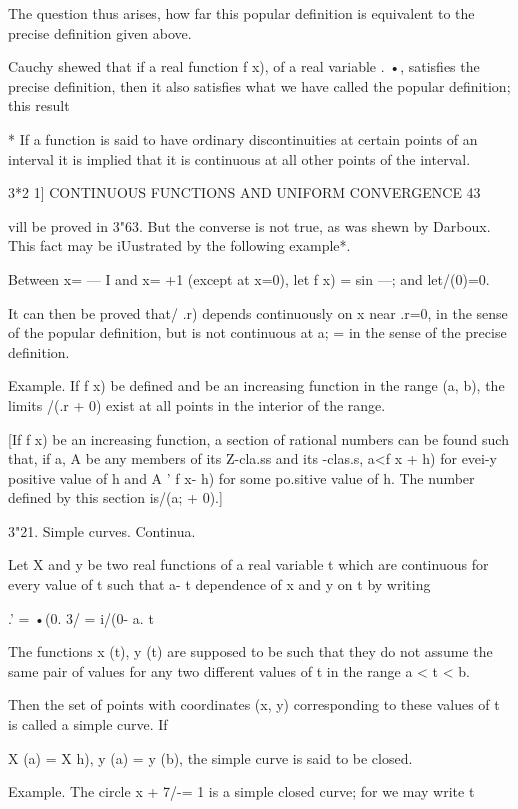 The question thus arises, how far this popular definition is
equivalent to the precise definition given above.

Cauchy shewed that if a real function f x), of a real variable . •,
satisfies the precise definition, then it also satisfies what we have
called the popular definition; this result

* If a function is said to have ordinary discontinuities at certain
points of an interval it is implied that it is continuous at all other
points of the interval.



3*2 1] CONTINUOUS FUNCTIONS AND UNIFORM CONVERGENCE 43

vill be proved in 3"63. But the converse is not true, as was shewn by
Darboux. This fact may be iUustrated by the following example*.

Between x= — I and x= +1 (except at x=0), let f x) = sin —; and
let/(0)=0.

It can then be proved that/ .r) depends continuously on x near .r=0,
in the sense of the popular definition, but is not continuous at a; =
in the sense of the precise definition.

Example. If f x) be defined and be an increasing function in the range
(a, b), the limits /(.r + 0) exist at all points in the interior of
the range.

[If f x) be an increasing function, a section of rational numbers can
be found such that, if a, A be any members of its Z-cla.ss and its
-clas.s, a<f x + h) for evei-y positive value of h and A ' f x- h) for
some po.sitive value of h. The number defined by this section is/(a; +
0).]

3"21. Simple curves. Continua.

Let X and y be two real functions of a real variable t which are
continuous for every value of t such that a- t %
dependence of x and y on t by writing

.' = •(0. 3/ = i/(0- a. t%

The functions x (t), y (t) are supposed to be such that they do not
assume the same pair of values for any two different values of t in
the range a < t < b.

Then the set of points with coordinates (x, y) corresponding to these
values of t is called a simple curve. If

X (a) = X h), y (a) = y (b), the simple curve is said to be closed.

Example. The circle x + 7/-= 1 is a simple closed curve; for we may
write t

